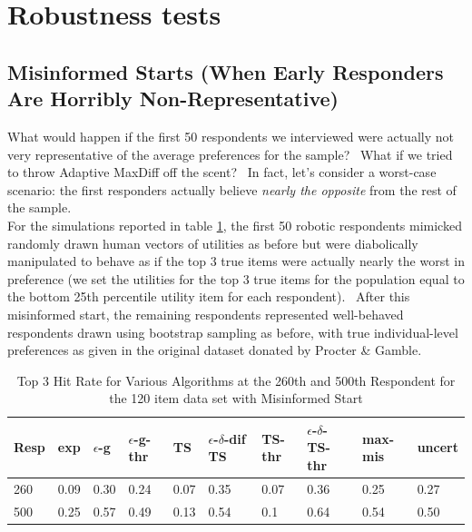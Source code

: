 \documentclass[a4paper,12pt]{article}
\newcommand{\alexander}[1]{\textcolor{blue}{\textbf{(alexander)} #1}}
\newcommand{\eric}[1]{\textcolor{red}{\textbf{(eric)} #1}}
\newcommand{\fixedexpressS}{\textbf{exp}}
\newcommand{\egreedyS}{$\epsilon$-\textbf{g}}
\newcommand{\egreedythresS}{$\epsilon$-\textbf{g-thr}}
\newcommand{\misminS}{\textbf{max-mis}}
\newcommand{\tsS}{\textbf{TS} }
\newcommand{\edtsS}{$\epsilon$-$\delta$-\textbf{dif TS} }
\newcommand{\tsthresS}{\textbf{TS-thr} }
\newcommand{\edtsthresS}{$\epsilon$-$\delta$-\textbf{TS-thr} }
\newcommand{\uncertS}{\textbf{uncert} }
\begin{document}



\section{Robustness tests} \label{sec:robust}

\subsection{Misinformed Starts (When Early Responders Are Horribly Non-Representative)}


What would happen if the first 50 respondents we interviewed were actually not very representative of the average preferences for the sample?  What if we tried to throw Adaptive MaxDiff off the scent?  In fact, let's consider a worst-case scenario: the first responders actually believe \textit{nearly the opposite} from the rest of the sample.\\
For the simulations reported in table \ref{table:120mis}, the first 50 robotic respondents mimicked randomly drawn human vectors of utilities as before but were diabolically manipulated to behave as if the top 3 true items were actually nearly the worst in preference (we set the utilities for the top 3 true items for the population equal to the bottom 25th percentile utility item for each respondent).  After this misinformed start, the remaining respondents represented well-behaved respondents drawn using bootstrap sampling as before, with true individual-level preferences as given in the original dataset donated by Procter \& Gamble.\\

\begin{table}
\begin{tabular}{llllllllll}
\hline   Resp &  \fixedexpressS&\egreedyS&\egreedythresS&\tsS&\edtsS&\tsthresS&\edtsthresS& \misminS& \uncertS   \\ \hline    260 &   0.09 &   0.30 & 0.24 & 0.07  & 0.35 & 0.07 &  0.36 & 0.25 &   0.27 \\
  500 &  0.25 &   0.57 &  0.49 &  0.13 & 0.54 &   0.1 &    0.64 & 0.54 &  0.50  \end{tabular}
\begin{center}
\caption{Top 3 Hit Rate for Various Algorithms at the 260th and 500th Respondent for the 120 item data set with Misinformed Start}
\label{table:120mis}
\end{center}
\end{table}
\end{document}
